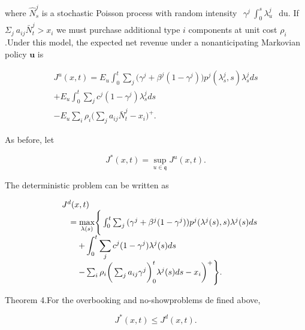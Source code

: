 where \(\hat { N } _ { s } ^ { j }\) is a stochastic Poisson process
with random intensity
\(\begin{array} { r } { \gamma ^ { j } \ \int _ { 0 } ^ { s } \lambda _ { u } ^ { j } } \end{array}\)
du. If
\(\Sigma _ { j } \ a _ { i j } \bar { N } _ { t } ^ { j } > x _ { i }\)
we must purchase additional type \(i\) components at unit cost
\(\rho _ { i }\) .Under this model, the expected net revenue under a
nonanticipating Markovian policy \(\boldsymbol { u }\) is

\[
\begin{array} { l } { \displaystyle { J ^ { u } ( x , t ) = E _ { u } \int _ { 0 } ^ { t } \sum _ { j } \big ( \gamma ^ { j } + \beta ^ { j } ( 1 - \gamma ^ { j } ) \big ) p ^ { j } ( \lambda _ { s } ^ { j } , s ) \lambda _ { s } ^ { j } d s } } \\ { \displaystyle { + E _ { u } \int _ { 0 } ^ { t } \sum _ { j } c ^ { j } ( 1 - \gamma ^ { j } ) \lambda _ { s } ^ { j } d s } } \\ { \displaystyle { - E _ { u } \sum _ { i } \rho _ { i } \Big ( \sum _ { j } a _ { i j } \bar { N } _ { t } ^ { j } - x _ { i } \Big ) ^ { + } . } } \end{array}
\]

As before, let

\[
J ^ { * } ( x , t ) = \operatorname* { s u p } _ { u \in \mathfrak { q } } J ^ { u } ( x , t ) .
\]

The deterministic problem can be written as

\[
\begin{array} { r l } & { J ^ { d } ( x , t ) } \\ & { \quad = \underset { \lambda ( s ) } { \operatorname* { m a x } } \Bigg \{ \int _ { 0 } ^ { t } \sum _ { j } { ( \gamma ^ { j } + \beta ^ { j } ( 1 - \gamma ^ { j } ) ) p ^ { j } ( \lambda ^ { j } ( s ) , s ) \lambda ^ { j } ( s ) d s } } \\ & { \qquad + \displaystyle \int _ { 0 } ^ { t } \sum _ { j } { c ^ { j } ( 1 - \gamma ^ { j } ) \lambda ^ { j } ( s ) d s } } \\ & { \qquad - \sum _ { i } \rho _ { i } \bigg ( \sum _ { j } { a _ { i j } \gamma ^ { j } } \bigg ) _ { 0 } ^ { t } \lambda ^ { j } ( s ) d s - x _ { i } \bigg ) ^ { + } \Bigg \} . } \end{array}
\]

Theorem 4.For the overbooking and no-showproblems de fined above,

\[
J ^ { * } ( x , t ) \leqslant J ^ { d } ( x , t ) .
\]

